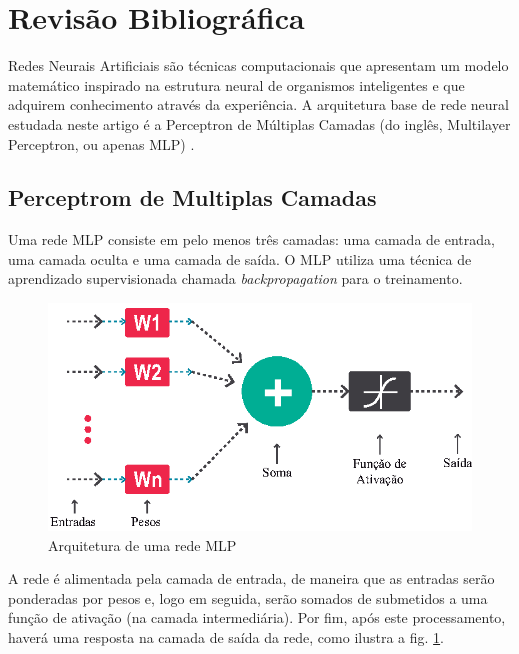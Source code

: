 \section{Revisão Bibliográfica} \label{revisaobibliografica}

Redes Neurais Artificiais são técnicas computacionais que apresentam um modelo matemático inspirado na estrutura neural de organismos inteligentes e que adquirem conhecimento através da experiência. A arquitetura base de rede neural estudada neste artigo é a Perceptron de Múltiplas Camadas (do inglês, Multilayer Perceptron, ou apenas MLP) \cite{kovacs2002redes} \cite{haykin2007redes}.

\subsection{Perceptrom de Multiplas Camadas}

Uma rede MLP consiste em pelo menos três camadas: uma camada de entrada, uma camada oculta e uma camada de saída. O MLP utiliza uma técnica de aprendizado supervisionada chamada \textit{backpropagation} para o treinamento.

\begin{figure}[H]

\centering %
\includegraphics{04-Figuras/Arquitetura}

\caption{Arquitetura de uma rede MLP}

\label{figura:arquitetura}

\end{figure}

A rede é alimentada pela camada de entrada, de maneira que as entradas serão ponderadas por pesos e, logo em seguida, serão somados de submetidos a uma função de ativação (na camada intermediária). Por fim, após este processamento, haverá uma resposta na camada de saída da rede, como ilustra a fig. \ref{figura:arquitetura}.



